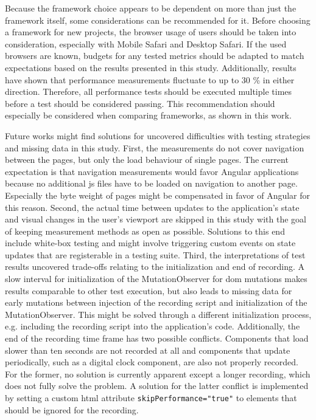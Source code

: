 \documentclass[a4paper, 12pt]{article}
\begin{document}
Because the framework choice appears to be dependent on more than just the framework itself, some considerations can be recommended for it.
Before choosing a framework for new projects, the browser usage of users should be taken into consideration, especially with Mobile Safari and Desktop Safari.
If the used browsers are known, budgets for any tested metrics should be adapted to match expectations based on the results presented in this study.
Additionally, results have shown that performance measurements fluctuate to up to 30 \% in either direction.
Therefore, all performance tests should be executed multiple times before a test should be considered passing.
This recommendation should especially be considered when comparing frameworks, as shown in this work.

Future works might find solutions for uncovered difficulties with testing strategies and missing data in this study.
First, the measurements do not cover navigation between the pages, but only the load behaviour of single pages.
The current expectation is that navigation measurements would favor Angular applications because no additional \acrlong{js} files have to be loaded on navigation to another page.
Especially the byte weight of pages might be compensated in favor of Angular for this reason.
Second, the actual time between updates to the application's state and visual changes in the user's viewport are skipped in this study with the goal of keeping measurement methods as open as possible.
Solutions to this end include white-box testing and might involve triggering custom events on state updates that are registerable in a testing suite.
Third, the interpretations of test results uncovered trade-offs relating to the initialization and end of recording.
A slow interval for initialization of the MutationObserver for \acrshort{dom} mutations makes results comparable to other test execution, but also leads to missing data for early mutations between injection of the recording script and initialization of the MutationObserver.
This might be solved through a different initialization process, e.g. including the recording script into the application's code.
Additionally, the end of the recording time frame has two possible conflicts.
Components that load slower than ten seconds are not recorded at all and components that update periodically, such as a digital clock component, are also not properly recorded.
For the former, no solution is currently apparent except a longer recording, which does not fully solve the problem.
A solution for the latter conflict is implemented by setting a custom \acrshort{html} attribute \verb|skipPerformance="true"| to elements that should be ignored for the recording.
\end{document}
